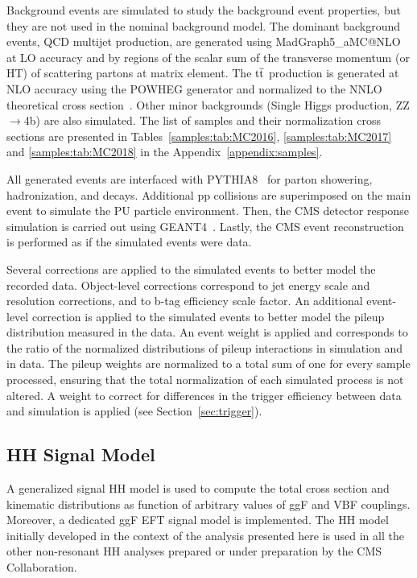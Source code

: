 Background events are simulated to study the background event properties, but they are not used in the nominal background model. The dominant background events, QCD multijet production, are generated using MadGraph5\_aMC@NLO at LO accuracy and by regions of the scalar sum of the transverse momentum (or HT) of scattering partons at matrix element. The $\mathrm{t\overline{t}}$ production is generated at NLO accuracy using the POWHEG generator and normalized to the NNLO theoretical cross section~\cite{Czakon:2011xx}. Other minor backgrounds (Single Higgs production, ZZ$\rightarrow$4b) are also simulated. The list of samples and their normalization cross sections are presented in Tables~\ref{samples:tab:MC2016}, \ref{samples:tab:MC2017} and \ref{samples:tab:MC2018}  in the Appendix~\ref{appendix:samples}.

All generated events are interfaced with PYTHIA8~\cite{Sjostrand:2014zea} for parton showering, hadronization, and decays. Additional pp collisions are superimposed on the main event to simulate the PU particle environment. Then, the CMS detector response simulation is carried out using GEANT4~\cite{Agostinelli:2002hh}. Lastly, the CMS event reconstruction is performed as if the simulated events were data. 
 
Several corrections are applied to the simulated events to better model the recorded data. Object-level corrections correspond to jet energy scale and resolution corrections, and to b-tag efficiency scale factor. An additional event-level correction is applied to the simulated events to better model the pileup distribution measured in the data. An event weight is applied and corresponds to the ratio of the normalized distributions of pileup interactions in simulation and in data. The pileup weights are normalized to a total sum of one for every sample processed, ensuring that the total normalization of each simulated process is not altered. A weight to correct for differences in the trigger efficiency between data and simulation is applied (see Section~\ref{sec:trigger}).

\subsection{HH Signal Model}
A generalized signal HH model is used to compute the total cross section and kinematic distributions as function of arbitrary values of ggF and VBF couplings.
Moreover, a dedicated ggF EFT signal model is implemented. The HH model initially developed in the context of the analysis presented here is used in all the other non-resonant HH analyses prepared or under preparation by the CMS Collaboration.

